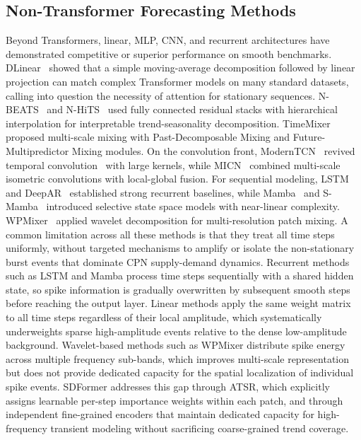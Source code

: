 \documentclass[journal]{IEEEtran}
\begin{document}
\subsection{Non-Transformer Forecasting Methods}

Beyond Transformers, linear, MLP, CNN, and recurrent architectures have
demonstrated competitive or superior performance on smooth benchmarks.
DLinear~\cite{dlinear} showed that a simple moving-average decomposition
followed by linear projection can match complex Transformer models on many
standard datasets, calling into question the necessity of attention for
stationary sequences.
N-BEATS~\cite{nbeats} and N-HiTS~\cite{nhits} used fully connected residual
stacks with hierarchical interpolation for interpretable trend-seasonality
decomposition.
TimeMixer~\cite{timemixer} proposed multi-scale mixing with
Past-Decomposable Mixing and Future-Multipredictor Mixing modules.
On the convolution front, ModernTCN~\cite{moderntcn} revived temporal
convolution~\cite{tcn} with large kernels, while MICN~\cite{micn}
combined multi-scale isometric convolutions with local-global fusion.
For sequential modeling, LSTM~\cite{lstm} and DeepAR~\cite{deepar}
established strong recurrent baselines, while Mamba~\cite{mamba} and
S-Mamba~\cite{smamba} introduced selective state space models with
near-linear complexity.
WPMixer~\cite{xpatch} applied wavelet decomposition for multi-resolution
patch mixing.
A common limitation across all these methods is that they treat all time
steps uniformly, without targeted mechanisms to amplify or isolate the
non-stationary burst events that dominate CPN supply-demand dynamics.
Recurrent methods such as LSTM and Mamba process time steps sequentially
with a shared hidden state, so spike information is gradually overwritten
by subsequent smooth steps before reaching the output layer.
Linear methods apply the same weight matrix to all time steps regardless
of their local amplitude, which systematically underweights sparse high-amplitude
events relative to the dense low-amplitude background.
Wavelet-based methods such as WPMixer distribute spike energy across multiple
frequency sub-bands, which improves multi-scale representation but does not
provide dedicated capacity for the spatial localization of individual spike events.
SDFormer addresses this gap through ATSR, which explicitly assigns learnable
per-step importance weights within each patch, and through independent
fine-grained encoders that maintain dedicated capacity for high-frequency
transient modeling without sacrificing coarse-grained trend coverage.
\end{document}
